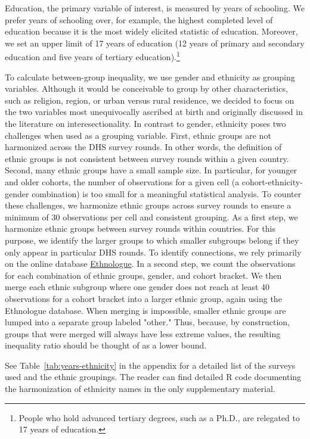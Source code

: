 Education, the primary variable of interest, is measured by years of schooling. We prefer years of schooling over, for example, the highest completed level of education because it is the most widely elicited statistic of education. Moreover, we set an upper limit of 17 years of education (12 years of primary and secondary education and five years of tertiary education).\footnote{People who hold advanced tertiary degrees, such as a Ph.D., are relegated to 17 years of education.} 

To calculate between-group inequality, we use gender and ethnicity as grouping variables. Although it would be conceivable to group by other characteristics, such as religion, region, or urban versus rural residence, we decided to focus on the two variables most unequivocally ascribed at birth and originally discussed in the literature on interesectionality. In contrast to gender, ethnicity poses two challenges when used as a grouping variable. First, ethnic groups are not harmonized across the DHS survey rounds. In other words, the definition of ethnic groups is not consistent between survey rounds within a given country. Second, many ethnic groups have a small sample size. In particular, for younger and older cohorts, the number of observations for a given cell (a cohort-ethnicity-gender combination) is too small for a meaningful statistical analysis. To counter these challenges, we harmonize ethnic groups across survey rounds to ensure a minimum of 30 observations per cell and consistent grouping. As a first step, we harmonize ethnic groups between survey rounds within countries. For this purpose, we identify the larger groups to which smaller subgroups belong if they only appear in particular DHS rounds. To identify connections, we rely primarily on the online database \href{https://www.ethnologue.com/}{Ethnologue}. In a second step, we count the observations for each combination of ethnic groups, gender, and cohort bracket. We then merge each ethnic subgroup where one gender does not reach at least 40 observations for a cohort bracket into a larger ethnic group, again using the Ethnologue database. When merging is impossible, smaller ethnic groups are lumped into a separate group labeled "other." Thus, because, by construction, groups that were merged will always have less extreme values, the resulting inequality ratio should be thought of as a lower bound. 

See Table~\ref{tab:years-ethnicity} in the appendix for a detailed list of the surveys used and the ethnic groupings. The reader can find detailed R code documenting the harmonization of ethnicity names in the only supplementary material.

